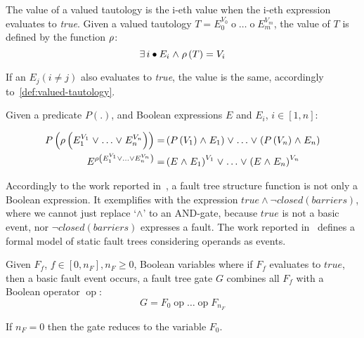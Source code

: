 \begin{definition}
\label{def:vtvalue}
The value of a valued tautology is the i-eth value when the i-eth expression evaluates to \emph{true}.
%
Given a valued tautology $T = E_0^{V_0} \mathop{op_0} \ldots \mathop{op_m} E_m^{V_m}$, the value of $T$ is defined by the function $\rho$:
\[
\exists i \bullet E_i \land \VTValue\left(T\right) = V_i  
\]
\end{definition}
If an $E_j (i\neq j)$ also evaluates to \emph{true}, the value is the same, accordingly to~\cref{def:valued-tautology}.

\begin{definition}
\label{def:vtvalue-rules}
Given a predicate $P\left(.\right)$, and Boolean expressions $E$ and $E_i$, $i \in [1,n]$:

\begin{align}
P\left(\rho\left(E_1^{V_1} \mathrel{\vee} \ldots \mathrel{\vee} E_n^{V_n}\right)\right) =& 
  \left( P\left(V_1\right) \mathrel{\wedge} E_1 \right) \mathrel{\vee} \ldots \mathrel{\vee}
  \left( P\left(V_n\right) \mathrel{\wedge} E_n \right)
  \\
E^{\rho\left(E_1^{V_1} \mathrel{\vee} \ldots \mathrel{\vee} E_n^{V_n}\right)} =& \left(E \mathrel{\wedge} E_1\right)^{V_1} \mathrel{\vee} \ldots \mathrel{\vee} \left(E \mathrel{\wedge} E_n\right)^{V_n}
\end{align} 
\end{definition}


Accordingly to the work reported in~\cite{STR2002}, a fault tree structure function is not only a Boolean expression.
%
It exemplifies with the expression $true \land \lnot closed(barriers)$, where we cannot just replace `$\land$' to an $\mathrm{AND}$-gate, because $true$ is not a basic event, nor $\lnot closed(barriers)$ expresses a fault.
%
The work reported in~\cite{XY2010} defines a formal model of static fault trees considering operands as events. 

\begin{definition}
Given $F_f$, $f \in [0,n_F], n_F \geq 0$, Boolean variables where if $F_f$ evaluates to $true$, then a basic fault event occurs, a fault tree gate $G$ combines all $F_f$ with a Boolean operator $\mathop{op}$:
\[G = F_0 \mathop{op} \ldots \mathop{op} F_{n_F}\]
\end{definition}

If $n_F = 0$ then the gate reduces to the variable $F_0$.

